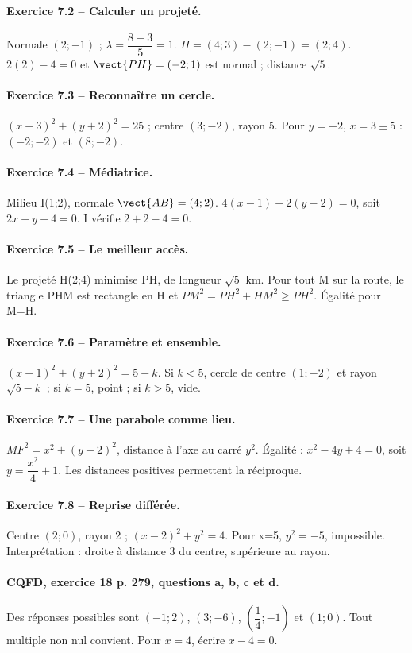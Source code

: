 \paragraph{Exercice 7.2 -- Calculer un projeté.} Normale $(2;-1)$ ; $\lambda =\dfrac{8-3}{5}=1$. $H=(4;3)-(2;-1)=(2;4)$. $2(2)-4=0$ et $\vect{PH}=(-2;1)$ est normal ; distance $\sqrt5$.
\paragraph{Exercice 7.3 -- Reconnaître un cercle.} $(x-3)^2+(y+2)^2=25$ ; centre $(3;-2)$, rayon 5. Pour $y=-2$, $x=3\pm5$ : $(-2;-2)$ et $(8;-2)$.
\paragraph{Exercice 7.4 -- Médiatrice.} Milieu I(1;2), normale $\vect{AB}=(4;2)$. $4(x-1)+2(y-2)=0$, soit $2x+y-4=0$. I vérifie $2+2-4=0$.
\paragraph{Exercice 7.5 -- Le meilleur accès.} Le projeté H(2;4) minimise PH, de longueur $\sqrt5$ km. Pour tout M sur la route, le triangle PHM est rectangle en H et $PM^2=PH^2+HM^2\geq PH^2$. Égalité pour M=H.
\paragraph{Exercice 7.6 -- Paramètre et ensemble.} $(x-1)^2+(y+2)^2=5-k$. Si $k<5$, cercle de centre $(1;-2)$ et rayon $\sqrt{5-k}$ ; si $k=5$, point ; si $k>5$, vide.
\paragraph{Exercice 7.7 -- Une parabole comme lieu.} $MF^2=x^2+(y-2)^2$, distance à l’axe au carré $y^2$. Égalité : $x^2-4y+4=0$, soit $y=\dfrac{x^2}{4}+1$. Les distances positives permettent la réciproque.
\paragraph{Exercice 7.8 -- Reprise différée.} Centre $(2;0)$, rayon 2 ; $(x-2)^2+y^2=4$. Pour x=5, $y^2=-5$, impossible. Interprétation : droite à distance 3 du centre, supérieure au rayon.
\paragraph{CQFD, exercice 18 p. 279, questions a, b, c et d.} Des réponses possibles sont $(-1;2)$, $(3;-6)$, $(\dfrac14;-1)$ et $(1;0)$. Tout multiple non nul convient. Pour $x=4$, écrire $x-4=0$.
